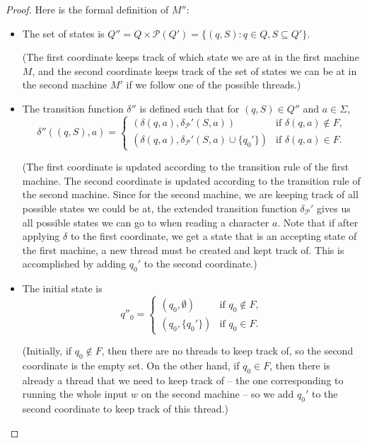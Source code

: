 \begin{flex}
\begin{proof}
Here is the formal definition of $M''$:
\begin{itemize}
    \item The set of states is $Q'' = Q \times \mathcal{P}(Q') = \{(q, S) : q \in Q, S \subseteq Q'\}$.

    (The first coordinate keeps track of which state we are at in the first machine $M$, and the second coordinate keeps track of the set of states we can be at in the second machine $M'$ if we follow one of the possible threads.)

    \item The transition function $\delta''$ is defined such that for $(q,S) \in Q''$ and $a \in \Sigma$, 
        \[ 
        \delta''( (q,S), a) = \begin{cases}
                                (\delta(q, a), \delta_{\mathcal{P}}'(S,a)) & \text{if } \delta(q,a) \not \in F, \\
                                (\delta(q, a), \delta_{\mathcal{P}}'(S,a) \cup \{q_0'\}) & \text{if } \delta(q,a) \in F.
                              \end{cases}
        \]

        (The first coordinate is updated according to the transition rule of the first machine. The second coordinate is updated according to the transition rule of the second machine. Since for the second machine, we are keeping track of all possible states we could be at, the extended transition function $\delta_{\mathcal{P}}'$ gives us all possible states we can go to when reading a character $a$. Note that if after applying $\delta$ to the first coordinate, we get a state that is an accepting state of the first machine, a new thread must be created and kept track of. This is accomplished by adding $q_0'$ to the second coordinate.)

    \item The initial state is 
        \[
        q''_0 = \begin{cases}
                    (q_0, \emptyset) & \text{if } q_0 \not \in F, \\
                    (q_0, \{q_0'\}) & \text{if } q_0 \in F.
                \end{cases}
        \]

        (Initially, if $q_0 \not \in F$, then there are no threads to keep track of, so the second coordinate is the empty set. On the other hand, if $q_0 \in F$, then there is already a thread that we need to keep track of -- the one corresponding to running the whole input  $w$ on the second machine -- so we add $q_0'$ to the second coordinate to keep track of this thread.)


\end{itemize}
\end{proof}
\end{flex}
